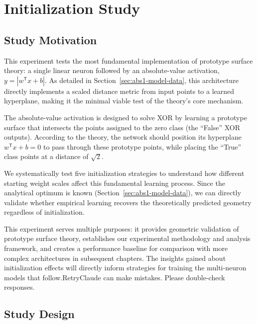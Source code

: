 ﻿%

\section{Initialization Study}
\label{sec:abs1-init}


\subsection*{Study Motivation}

This experiment tests the most fundamental implementation of prototype surface theory: a single linear neuron followed by an absolute-value activation, $y = |w^{\mathsf{T}}x + b|$. As detailed in Section~\ref{sec:abs1-model-data}, this architecture directly implements a scaled distance metric from input points to a learned hyperplane, making it the minimal viable test of the theory's core mechanism.

The absolute-value activation is designed to solve XOR by learning a prototype surface that intersects the points assigned to the zero class (the ``False'' XOR outputs). According to the theory, the network should position its hyperplane $w^{\mathsf{T}}x + b = 0$ to pass through these prototype points, while placing the ``True'' class points at a distance of $\sqrt{2}$.

We systematically test five initialization strategies to understand how different starting weight scales affect this fundamental learning process. Since the analytical optimum is known (Section~\ref{sec:abs1-model-data}), we can directly validate whether empirical learning recovers the theoretically predicted geometry regardless of initialization.

This experiment serves multiple purposes: it provides geometric validation of prototype surface theory, establishes our experimental methodology and analysis framework, and creates a performance baseline for comparison with more complex architectures in subsequent chapters. The insights gained about initialization effects will directly inform strategies for training the multi-neuron models that follow.RetryClaude can make mistakes. Please double-check responses.


\subsection*{Study Design}

